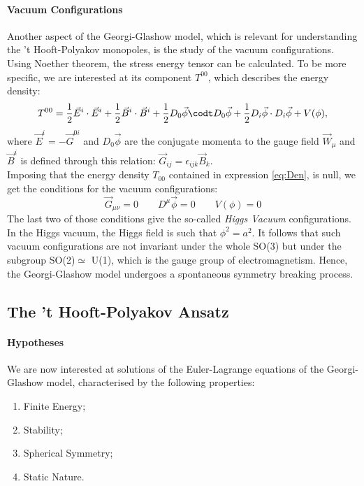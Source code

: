 \documentclass[main.tex]{subfiles}
\begin{document}
\paragraph{Vacuum Configurations}Another aspect of the Georgi-Glashow model, which is relevant for understanding the 't Hooft-Polyakov monopoles, is the study of the vacuum configurations.\\
Using Noether theorem, the stress energy tensor can be calculated. To be more specific, we are interested at its component $T^{00}$, which describes the energy density: 
\begin{equation}
T^{00} = \frac{1}{2} \Vec{E}^i \cdot  \Vec{E}^i + \frac{1}{2} \Vec{B}^i \cdot \Vec{B}^i +\frac{1}{2} D_0 \Vec{\phi} \codt D_0 \Vec{\phi} +\frac{1}{2} D_i \Vec{\phi} \cdot  D_i \Vec{\phi} + V(\phi),
\label{eq:Den}
\end{equation}
where $\Vec{E}^i = - \Vec{G}^{0i}$ and $D_0 \Vec{\phi}$ are the conjugate momenta to the gauge field $\Vec{W}_{\mu}$ and $\Vec{B}^i$ is defined through this relation: $ \Vec{G}_{ij} = \epsilon_{ijk} \Vec{B}_k$.\\
Imposing that the energy density $T_{00}$ contained in expression \ref{eq:Den}, is null, we get the conditions for the vacuum configurations:
\begin{equation}
\Vec{G}_{\mu \nu} = 0 \qquad D^{\mu} \Vec{\phi}  = 0 \qquad V(\phi)=0
\end{equation}
The last two of those conditions give the so-called \textit{Higgs Vacuum} configurations. 
In the Higgs vacuum, the Higgs field is such that $\phi^2 = a^2$. It follows that such vacuum configurations are not invariant under the whole SO(3) but under the subgroup SO(2)$\simeq$ U(1), which is the gauge group of electromagnetism. Hence, the Georgi-Glashow model undergoes a spontaneous symmetry breaking process.

\subsection{The 't Hooft-Polyakov Ansatz}
 \paragraph{Hypotheses}We are now interested at solutions of the Euler-Lagrange equations of the Georgi-Glashow model, characterised by the following properties: 
 \begin{enumerate}
     \item Finite Energy; 
     \item Stability; 
     \item Spherical Symmetry;
     \item Static Nature.
 \end{enumerate}
 
\end{document}
